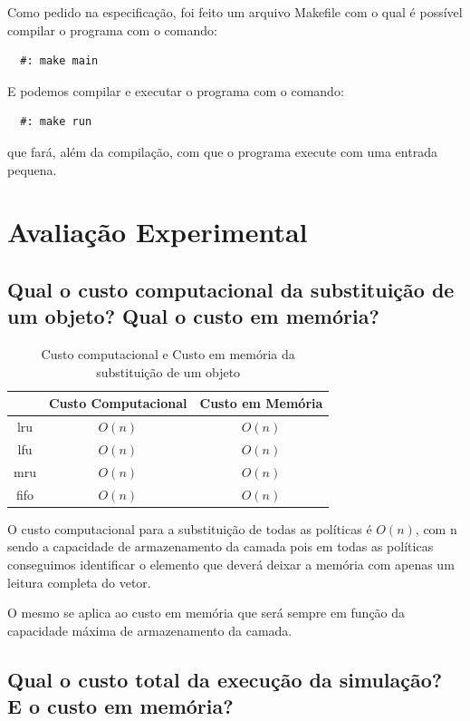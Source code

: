 \documentclass[12pt]{article}
\begin{document}
Como pedido na especificação, foi feito um arquivo Makefile com o qual é possível compilar
o programa com o comando: 
\begin{verbatim}
  #: make main
\end{verbatim}

E podemos compilar e executar o programa com o comando:
\begin{verbatim}
  #: make run
\end{verbatim}
que fará, além da compilação, com que o programa execute com uma entrada pequena.

\section{Avaliação Experimental}
\label{avaliacao_experimental}

\subsection{Qual o custo computacional da substituição de um objeto? Qual o custo em memória?}

\begin{table}[htb]
\centering
\caption{Custo computacional e Custo em memória da substituição de um objeto}
\begin{tabular}{|c|c|c|}
\hline  & Custo Computacional & Custo em Memória \\ 
\hline lru & $O(n)$ & $O(n)$ \\ 
\hline lfu & $O(n)$ & $O(n)$ \\ 
\hline mru & $O(n)$ & $O(n)$ \\ 
\hline fifo & $O(n)$ & $O(n)$ \\ 
\hline 
\end{tabular}
\end{table}

O custo computacional para a substituição de todas as políticas é $O(n)$, com n
sendo a capacidade de armazenamento da camada pois em todas as políticas conseguimos 
identificar o elemento que deverá deixar a memória com apenas um leitura completa do 
vetor.

O mesmo se aplica ao custo em memória que será sempre em função da capacidade
máxima de armazenamento da camada.

\subsection{Qual o custo total da execução da simulação? E o custo em memória?}
\end{document}
